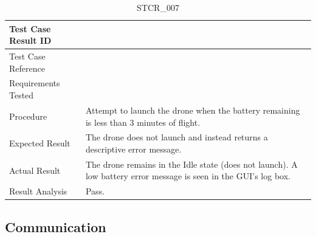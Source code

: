 \documentclass[12pt, titlepage]{article}
\begin{document}
\begin{table}[!h]
\begin{center}
\caption {STCR\_007}
\label{tab:STCR_007}
\begin{tabular}{ | m{3.2cm} | m{12.2cm} | } 
\hline
Test Case Result ID & \nameref{tab:STCR_007} \\ 
\hline
Test Case Reference & \nameref{tab:STC_007}  \\ 
\hline
Requirements Tested & \nameref{SR_012} \\ 
\hline
Procedure & Attempt to launch the drone when the battery remaining is less than 3 minutes of flight.  \\ 
\hline
Expected Result & The drone does not launch and instead returns a descriptive error message.   \\ 
\hline
Actual Result & The drone remains in the Idle state (does not launch). A low battery error message is seen in the GUI's log box.  \\
\hline
Result Analysis & Pass. \\ 
\hline
\end{tabular}
\end{center}
\end{table}

\clearpage

\subsection{Communication}
\end{document}
